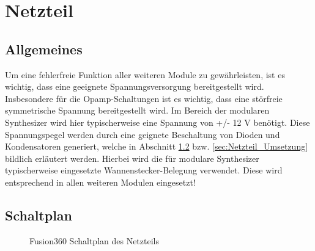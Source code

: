 \chapter{Netzteil}
\label{ch:Netzteil}

\section{Allgemeines}
Um eine fehlerfreie Funktion aller weiteren Module zu gewährleisten, ist es wichtig, dass eine geeignete Spannungsversorgung bereitgestellt wird. 
Insbesondere für die Opamp-Schaltungen ist es wichtig, dass eine störfreie symmetrische Spannung bereitgestellt wird. 
Im Bereich der modularen Synthesizer wird hier typischerweise eine Spannung von +/- 12 V benötigt. Diese Spannungspegel werden durch eine geignete Beschaltung von Dioden und Kondensatoren generiert, welche in Abschnitt \ref{sec:Netzteil_Schaltplan} bzw. \ref{sec:Netzteil_Umsetzung} bildlich erläutert werden. Hierbei wird die für modulare Synthesizer typischerweise eingesetzte Wannenstecker-Belegung verwendet. Diese wird entsprechend in allen weiteren Modulen eingesetzt!

\newpage

\FloatBarrier
\section{Schaltplan}
\label{sec:Netzteil_Schaltplan}

\begin{figure}[h]
\centering
\setlength{\fboxsep}{1pt} %
\setlength{\fboxrule}{1pt} %
\caption{Fusion360 Schaltplan des Netzteils}
\label{fig:Netzteil_Schaltplan}
\end{figure}
\FloatBarrier

\FloatBarrier
